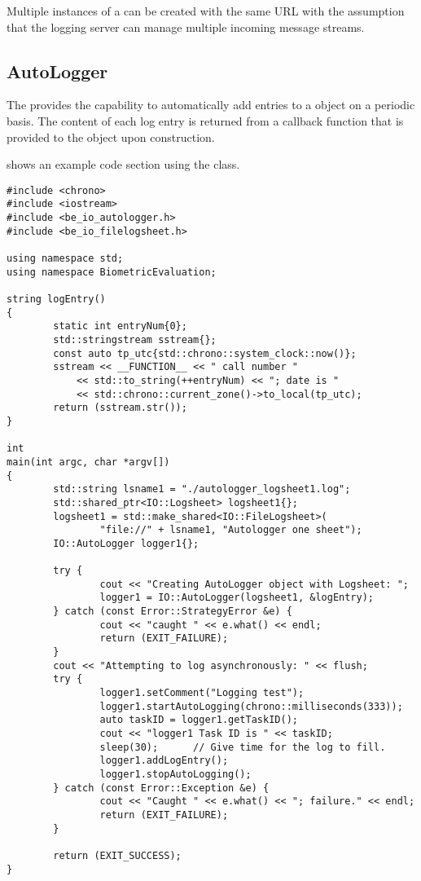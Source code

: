 Multiple instances of a  can be created with the same URL
with the assumption that the logging server can manage multiple incoming
message streams.

\subsection{AutoLogger}
\label{sec-autologger}

The  provides the capability to automatically add entries
to a  object on a periodic basis. The content of each log entry
is returned from a callback function that is provided to the 
object upon construction.

 shows an example code section using the
 class.

\begin{lstlisting}[caption={Using an \class{AutoLogger} Object}, label=lst:autologgeruse]
#include <chrono>
#include <iostream>
#include <be_io_autologger.h>
#include <be_io_filelogsheet.h>

using namespace std;
using namespace BiometricEvaluation;

string logEntry()
{
        static int entryNum{0};
        std::stringstream sstream{};
        const auto tp_utc{std::chrono::system_clock::now()};
        sstream << __FUNCTION__ << " call number "
            << std::to_string(++entryNum) << "; date is "
            << std::chrono::current_zone()->to_local(tp_utc);
        return (sstream.str());
}

int
main(int argc, char *argv[])
{
        std::string lsname1 = "./autologger_logsheet1.log";
        std::shared_ptr<IO::Logsheet> logsheet1{};
        logsheet1 = std::make_shared<IO::FileLogsheet>(
                "file://" + lsname1, "Autologger one sheet");
        IO::AutoLogger logger1{};

        try {
                cout << "Creating AutoLogger object with Logsheet: ";
                logger1 = IO::AutoLogger(logsheet1, &logEntry);
        } catch (const Error::StrategyError &e) {
                cout << "caught " << e.what() << endl;
                return (EXIT_FAILURE);
        }
        cout << "Attempting to log asynchronously: " << flush;
        try {
                logger1.setComment("Logging test");
                logger1.startAutoLogging(chrono::milliseconds(333));
                auto taskID = logger1.getTaskID();
                cout << "logger1 Task ID is " << taskID;
                sleep(30);      // Give time for the log to fill.
                logger1.addLogEntry();
                logger1.stopAutoLogging();
        } catch (const Error::Exception &e) {
                cout << "Caught " << e.what() << "; failure." << endl;
                return (EXIT_FAILURE);
        }

        return (EXIT_SUCCESS);
}
\end{lstlisting}

